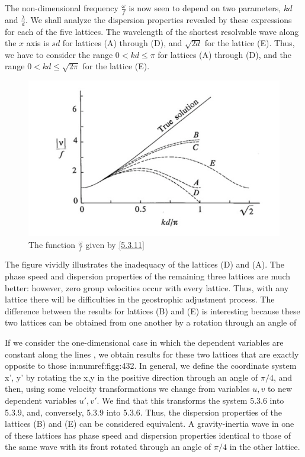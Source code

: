 The non-dimensional frequency $\frac{\omega}{f}$ is now seen to depend on two parameters, $kd$ and $\frac{\lambda}{d}$.
We shall analyze the dispersion properties revealed by these expressions for each of the five lattices. The wavelength of the shortest resolvable wave along the $x$ axis is $sd$ for lattices (A) through (D), and $\sqrt{2d}$ for the lattice (E). Thus, we have to consider the range $0<kd\leq\pi$ for lattices (A) through (D), and the range $0<kd\leq\sqrt{2\pi}$ for the lattice (E).
\begin{figure}[h]
    \centering
    \includegraphics[width=0.5\linewidth]{uploads/Screenshot 2024-11-14 124014.png}
    \caption{The function $\frac{\omega}{f}$ given by \ref{5.3.11}}
    \label{fig:5.3.2}
\end{figure}
The figure vividly illustrates the inadequacy of the lattices (D) and (A). The phase speed and dispersion properties of the remaining three lattices are much better: however, zero group velocities occur with every lattice. Thus, with any lattice there will be difficulties in the geostrophic adjustment process.
The difference between the results for lattices (B) and (E) is interesting because these two lattices can be obtained from one another by a rotation through an angle of 
 
 If we consider the one-dimensional case in which the dependent variables are constant along the lines 
, we obtain results for these two lattices that are exactly opposite to those in:numref:figg:432. In general, we define the coordinate system x’, y’ by rotating the x,y in the positive direction through an angle of $\pi/4$, and then, using some velocity transformations we change from variables $u,v$ to new dependent variables $u',v'$. We find that this transforms the system 5.3.6 into 5.3.9, and, conversely, 5.3.9 into 5.3.6. Thus, the dispersion properties of the lattices (B) and (E) can be considered equivalent. A gravity-inertia wave in one of these lattices has phase speed and dispersion properties identical to those of the same wave with its front rotated through an angle of $\pi/4$ in the other lattice.

